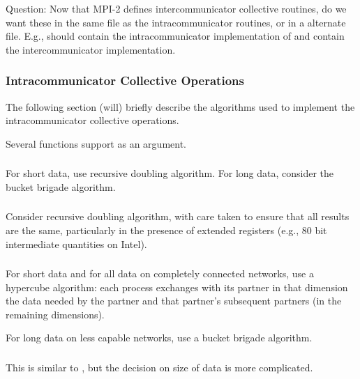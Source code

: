 \documentclass{article}
\begin{document}
Question: Now that MPI-2 defines intercommunicator collective
routines, do we want these in the same file as the intracommunicator
routines, or in a alternate file.  E.g., should  contain
the intracommunicator implementation of  and
 contain the intercommunicator implementation.

\subsubsection{Intracommunicator Collective Operations}
The following section (will) briefly describe the algorithms used to implement
the intracommunicator collective operations.

Several functions support  as an argument.

\subsubsection{}
For short data, use recursive doubling algorithm.  For long data, consider the
bucket brigade algorithm.

\subsubsection{}
Consider recursive doubling algorithm, with care taken to ensure that all
results are the same, particularly in the presence of extended registers
(e.g., 80 bit intermediate quantities on Intel).

\subsubsection{}
For short data and for all data on completely connected networks, use a
hypercube algorithm: each process exchanges with its partner in that dimension
the data needed by the partner and that partner's subsequent partners (in the
remaining dimensions).

For long data on less capable networks, use a bucket brigade algorithm.

\subsubsection{}
This is similar to , but the decision on size of data is
more complicated. 

\subsubsection{}
\end{document}
